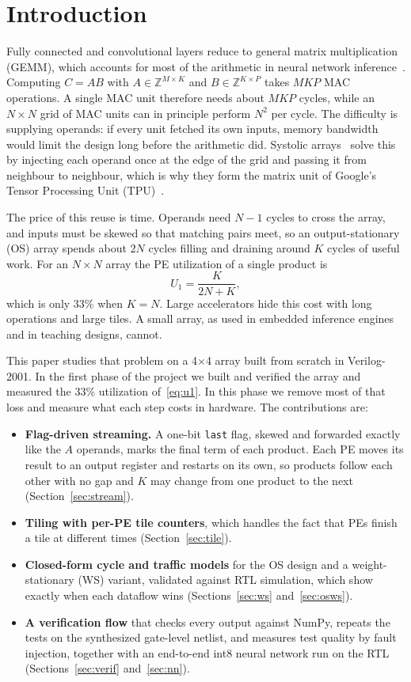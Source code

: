 \documentclass[conference]{IEEEtran}
\newcommand{\code}[1]{\texttt{#1}}
\begin{document}
\section{Introduction}
Fully connected and convolutional layers reduce to general matrix multiplication (GEMM), which accounts for most of the arithmetic in neural network inference~\cite{sze2017}. Computing $C = AB$ with $A \in \mathbb{Z}^{M\times K}$ and $B \in \mathbb{Z}^{K\times P}$ takes $MKP$ MAC operations. A single MAC unit therefore needs about $MKP$ cycles, while an $N\times N$ grid of MAC units can in principle perform $N^2$ per cycle. The difficulty is supplying operands: if every unit fetched its own inputs, memory bandwidth would limit the design long before the arithmetic did. Systolic arrays~\cite{kunglei1978,kung1982} solve this by injecting each operand once at the edge of the grid and passing it from neighbour to neighbour, which is why they form the matrix unit of Google's Tensor Processing Unit (TPU)~\cite{jouppi2017}.

The price of this reuse is time. Operands need $N{-}1$ cycles to cross the array, and inputs must be skewed so that matching pairs meet, so an output-stationary (OS) array spends about $2N$ cycles filling and draining around $K$ cycles of useful work. For an $N\times N$ array the PE utilization of a single product is
\begin{equation}
U_1 = \frac{K}{2N + K},
\label{eq:u1}
\end{equation}
which is only 33\% when $K = N$. Large accelerators hide this cost with long operations and large tiles. A small array, as used in embedded inference engines and in teaching designs, cannot.

This paper studies that problem on a 4$\times$4 array built from scratch in Verilog-2001. In the first phase of the project we built and verified the array and measured the 33\% utilization of~\eqref{eq:u1}. In this phase we remove most of that loss and measure what each step costs in hardware. The contributions are:
\begin{itemize}
\item \textbf{Flag-driven streaming.} A one-bit \code{last} flag, skewed and forwarded exactly like the $A$ operands, marks the final term of each product. Each PE moves its result to an output register and restarts on its own, so products follow each other with no gap and $K$ may change from one product to the next (Section~\ref{sec:stream}).
\item \textbf{Tiling with per-PE tile counters}, which handles the fact that PEs finish a tile at different times (Section~\ref{sec:tile}).
\item \textbf{Closed-form cycle and traffic models} for the OS design and a weight-stationary (WS) variant, validated against RTL simulation, which show exactly when each dataflow wins (Sections~\ref{sec:ws} and~\ref{sec:osws}).
\item \textbf{A verification flow} that checks every output against NumPy, repeats the tests on the synthesized gate-level netlist, and measures test quality by fault injection, together with an end-to-end int8 neural network run on the RTL (Sections~\ref{sec:verif} and~\ref{sec:nn}).
\end{itemize}
\end{document}
